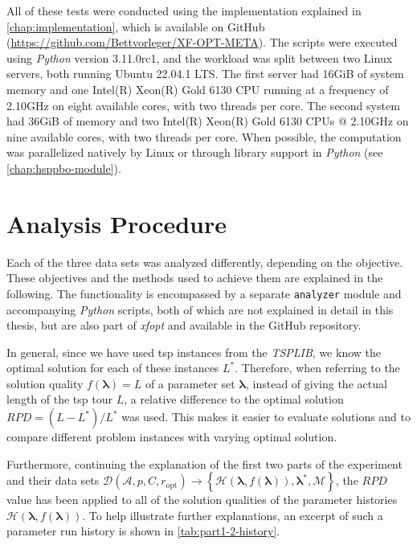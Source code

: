 All of these tests were conducted using the implementation explained in \cref{chap:implementation}, which is available on GitHub (\url{https://github.com/Bettvorleger/XF-OPT-META}). The scripts were executed using \textit{Python} version 3.11.0rc1, and the workload was split between two Linux servers, both running Ubuntu 22.04.1 LTS. The first server had 16GiB of system memory and one Intel(R) Xeon(R) Gold 6130 CPU running at a frequency of 2.10GHz on eight available cores, with two threads per core. The second system had 36GiB of memory and two Intel(R) Xeon(R) Gold 6130 CPUs @ 2.10GHz on nine available cores, with two threads per core. When possible, the computation was parallelized natively by Linux or through library support in \textit{Python} (see \cref{chap:hsppbo-module}).
 
\section{Analysis Procedure}
\label{chap:analysis}

Each of the three data sets was analyzed differently, depending on the objective. These objectives and the methods used to achieve them are explained in the following. The functionality is encompassed by a separate \texttt{analyzer} module and accompanying \textit{Python} scripts, both of which are not explained in detail in this thesis, but are also part of \textit{\gls{xfopt}} and available in the GitHub repository. 

In general, since we have used \gls{tsp} instances from the \textit{TSPLIB}, we know the optimal solution for each of these instances $L^*$. Therefore, when referring to the solution quality $f(\mathbf{\lambda}) = L$ of a parameter set $\mathbf{\lambda}$, instead of giving the actual length of the \gls{tsp} tour $L$, a relative difference to the optimal solution $RPD = (L - L^*) / L^*$ was used. This makes it easier to evaluate solutions and to compare different problem instances with varying optimal solution.

Furthermore, continuing the explanation of the first two parts of the experiment and their data sets $\mathcal{D}(\mathcal{A},p,C,r_\text{opt}) \to \left\lbrace \mathcal{H}(\mathbf{\lambda}, f(\mathbf{\lambda})), \mathbf{\lambda^*}, \mathcal{M} \right\rbrace$, the $RPD$ value has been applied to all of the solution qualities of the parameter histories $\mathcal{H}(\mathbf{\lambda}, f(\mathbf{\lambda}))$.
To help illustrate further explanations, an excerpt of such a parameter run history is shown in \cref{tab:part1-2-history}.

